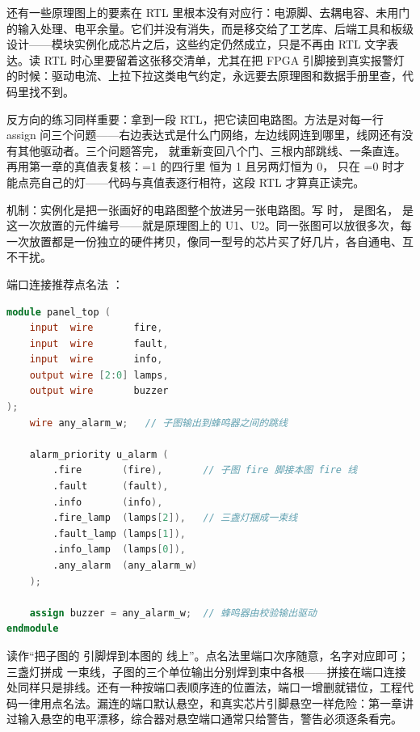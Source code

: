 还有一些原理图上的要素在 RTL 里根本没有对应行：电源脚、去耦电容、未用门的输入处理、电平余量。它们并没有消失，而是移交给了工艺库、后端工具和板级设计——模块实例化成芯片之后，这些约定仍然成立，只是不再由 RTL 文字表达。读 RTL 时心里要留着这张移交清单，尤其在把 FPGA 引脚接到真实报警灯的时候：驱动电流、上拉下拉这类电气约定，永远要去原理图和数据手册里查，代码里找不到。

反方向的练习同样重要：拿到一段 RTL，把它读回电路图。方法是对每一行 assign 问三个问题——右边表达式是什么门网络，左边线网连到哪里，线网还有没有其他驱动者。三个问题答完， 就重新变回八个门、三根内部跳线、一条直连。再用第一章的真值表复核：=1 的四行里  恒为 1 且另两灯恒为 0， 只在 =0 时才能点亮自己的灯——代码与真值表逐行相符，这段 RTL 才算真正读完。

机制：实例化是把一张画好的电路图整个放进另一张电路图。写  时， 是图名， 是这一次放置的元件编号——就是原理图上的 U1、U2。同一张图可以放很多次，每一次放置都是一份独立的硬件拷贝，像同一型号的芯片买了好几片，各自通电、互不干扰。

端口连接推荐点名法 ：

\begin{lstlisting}[language=Verilog]
module panel_top (
    input  wire       fire,
    input  wire       fault,
    input  wire       info,
    output wire [2:0] lamps,
    output wire       buzzer
);
    wire any_alarm_w;   // 子图输出到蜂鸣器之间的跳线

    alarm_priority u_alarm (
        .fire       (fire),       // 子图 fire 脚接本图 fire 线
        .fault      (fault),
        .info       (info),
        .fire_lamp  (lamps[2]),   // 三盏灯捆成一束线
        .fault_lamp (lamps[1]),
        .info_lamp  (lamps[0]),
        .any_alarm  (any_alarm_w)
    );

    assign buzzer = any_alarm_w;  // 蜂鸣器由校验输出驱动
endmodule
\end{lstlisting}

 读作“把子图的  引脚焊到本图的  线上”。点名法里端口次序随意，名字对应即可；三盏灯拼成  一束线，子图的三个单位输出分别焊到束中各根——拼接在端口连接处同样只是排线。还有一种按端口表顺序连的位置法，端口一增删就错位，工程代码一律用点名法。漏连的端口默认悬空，和真实芯片引脚悬空一样危险：第一章讲过输入悬空的电平漂移，综合器对悬空端口通常只给警告，警告必须逐条看完。

